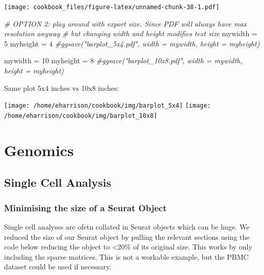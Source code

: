 \documentclass[]{book}
\newenvironment{Shaded}{\begin{snugshade}}{\end{snugshade}}
\newcommand{\CommentTok}[1]{\textcolor[rgb]{0.56,0.35,0.01}{\textit{#1}}}
\newcommand{\DecValTok}[1]{\textcolor[rgb]{0.00,0.00,0.81}{#1}}
\newcommand{\NormalTok}[1]{#1}
\newcommand{\StringTok}[1]{\textcolor[rgb]{0.31,0.60,0.02}{#1}}
\begin{document}
\texttt{[image: cookbook\_files/figure-latex/unnamed-chunk-38-1.pdf]}

\begin{Shaded}
\begin{Highlighting}[]
\CommentTok{# OPTION 2: play around with export size. Since PDF will always have max resolution anyway}
\CommentTok{# but changing width and height modifies text size}
\NormalTok{mywidth  =}\StringTok{ }\DecValTok{5}
\NormalTok{myheight =}\StringTok{ }\DecValTok{4}
\CommentTok{#ggsave("barplot_5x4.pdf", width = mywidth, height = myheight)}

\NormalTok{mywidth  =}\StringTok{ }\DecValTok{10}
\NormalTok{myheight =}\StringTok{ }\DecValTok{8}
\CommentTok{#ggsave("barplot_10x8.pdf", width = mywidth, height = myheight)}
\end{Highlighting}
\end{Shaded}

Same plot 5x4 inches vs 10x8 inches:

\texttt{[image: /home/eharrison/cookbook/img/barplot\_5x4]}
\texttt{[image: /home/eharrison/cookbook/img/barplot\_10x8]}

\hypertarget{genomics}{%
\chapter{Genomics}\label{genomics}}

\hypertarget{single-cell-analysis}{%
\section{Single Cell Analysis}\label{single-cell-analysis}}

\hypertarget{minimising-the-size-of-a-seurat-object}{%
\subsection{Minimising the size of a Seurat Object}\label{minimising-the-size-of-a-seurat-object}}

Single cell analyses are ofetn collated in Seurat objects which can be huge. We reduced the size of our Seurat object by pulling the relevant sections using the code below reducing the object to \textless{}20\% of its original size. This works by only including the sparse matrices. This is not a workable example, but the PBMC dataset could be used if necessary.
\end{document}
